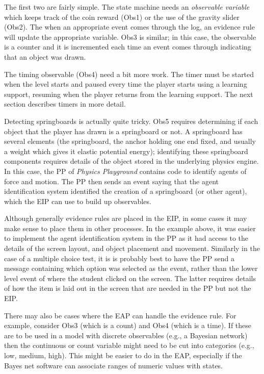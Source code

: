 \documentclass{article}
\begin{document}
  The first two are fairly simple.  The state machine needs an
  \textit{observable variable} which keeps track of the coin reward
  (Obs1) or the use of the gravity slider (Obs2).  The when an
  appropriate event comes through the log, an evidence rule will
  update the appropriate variable.  Obs3 is similar; in this case, the
  observable is a counter and it is incremented each time an event
  comes through indicating that an object was drawn.

  The timing observable (Obs4) need a bit more work.  The timer must
  be started when the level starts and paused every time the player
  starts using a learning support, resuming when the player returns
  from the learning support.  The next section describes timers in
  more detail.
  
  Detecting springboards is actually quite tricky.  Obs5 requires
  determining if each object that the player has drawn is a
  springboard or not.  A springboard has several elements (the
  springboard, the anchor holding one end fixed, and usually a weight
  which gives it elastic potential energy); identifying these
  springboard components requires details of the object stored in the
  underlying physics engine.  In this case, the PP of \textit{Physics
    Playground} contains code to identify agents of force and motion.
  The PP then sends an event saying that the agent identification
  system identified the creation of a springboard (or other agent),
  which the EIP can use to build up observables.

  Although generally evidence rules are placed in the EIP, in some
  cases it may make sense to place them in other processes.  In the
  example above, it was easier to implement the agent identification
  system in the PP as it had access to the details of the screen
  layout, and object placement and movement.  Similarly in the case
  of a multiple choice test, it is is probably best to have the PP
  send a message containing which option was selected as the event,
  rather than the lower level event of where the student clicked on
  the screen.  The latter requires details of how the item is laid
  out in the screen that are needed in the PP but not the EIP.

  There may also be cases where the EAP can handle the evidence rule.
  For example, consider Obs3 (which is a count) and Obs4 (which is a
  time).  If these are to be used in a model with discrete observables
  (e.g., a Bayesian network) then the continuous or count variable
  might need to be cut into categories (e.g., low, medium, high).
  This might be easier to do in the EAP, especially if the Bayes net
  software can associate ranges of numeric values with states.
  
\end{document}

